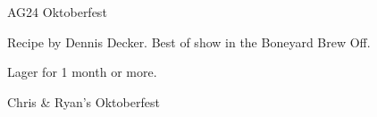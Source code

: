\begin{recipe}{AG24 Oktoberfest} %

\begin{aboutblock}
Recipe by Dennis Decker. Best of show in the Boneyard Brew Off.
\end{aboutblock}


\begin{methodandtiming}

\begin{mashsteps}
\end{mashsteps}

\begin{fermentationsteps}
\end{fermentationsteps}

\begin{directions}
Lager for 1 month or more.
\end{directions}

\end{methodandtiming}

\recipebreak

\begin{ingredientsblock}

\begin{malts}
\end{malts}

\begin{hops}
\end{hops}


\end{ingredientsblock}

\begin{recipe}{Chris \& Ryan's Oktoberfest} %


\end{recipe}
\end{recipe}
